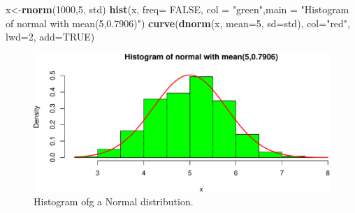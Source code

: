 \documentclass[]{article}
\newenvironment{Shaded}{\begin{snugshade}}{\end{snugshade}}
\newcommand{\KeywordTok}[1]{\textcolor[rgb]{0.13,0.29,0.53}{\textbf{{#1}}}}
\newcommand{\DataTypeTok}[1]{\textcolor[rgb]{0.13,0.29,0.53}{{#1}}}
\newcommand{\DecValTok}[1]{\textcolor[rgb]{0.00,0.00,0.81}{{#1}}}
\newcommand{\StringTok}[1]{\textcolor[rgb]{0.31,0.60,0.02}{{#1}}}
\newcommand{\OtherTok}[1]{\textcolor[rgb]{0.56,0.35,0.01}{{#1}}}
\newcommand{\NormalTok}[1]{{#1}}
\begin{document}
\begin{Shaded}
\begin{Highlighting}[]
\NormalTok{x<-}\KeywordTok{rnorm}\NormalTok{(}\DecValTok{1000}\NormalTok{,}\DecValTok{5}\NormalTok{, std) }
\KeywordTok{hist}\NormalTok{(x, }\DataTypeTok{freq=} \OtherTok{FALSE}\NormalTok{, }\DataTypeTok{col =} \StringTok{"green"}\NormalTok{,}\DataTypeTok{main =} \StringTok{"Histogram of normal with mean(5,0.7906)"}\NormalTok{)}
\KeywordTok{curve}\NormalTok{(}\KeywordTok{dnorm}\NormalTok{(x, }\DataTypeTok{mean=}\DecValTok{5}\NormalTok{, }\DataTypeTok{sd=}\NormalTok{std), }
          \DataTypeTok{col=}\StringTok{"red"}\NormalTok{, }\DataTypeTok{lwd=}\DecValTok{2}\NormalTok{, }\DataTypeTok{add=}\OtherTok{TRUE}\NormalTok{)}
\end{Highlighting}
\end{Shaded}

\begin{figure}[htbp]
\centering
\includegraphics{./TCL_Convergence_files/figure-latex/unnamed-chunk-7-1.pdf}
\caption{Histogram ofg a Normal distribution.}
\end{figure}
\end{document}
